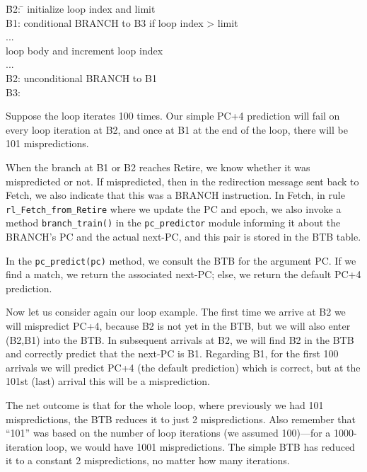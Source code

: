 \begin{tabbing}
\hmm \= B2: \hm \= \kill
     \>         \> initialize loop index and limit \\
     \> B1:     \> conditional BRANCH to B3 if loop index > limit \\
     \>         \> ... \\
     \>         \> loop body and increment loop index \\
     \>         \> ... \\
     \> B2:     \> unconditional BRANCH to B1 \\
     \> B3:
\end{tabbing}

Suppose the loop iterates 100 times. Our simple PC+4 prediction will
fail on every loop iteration at B2, and once at B1 at the end of the
loop, {\ie} there will be 101 mispredictions.

When the branch at B1 or B2 reaches Retire, we know whether it was
mispredicted or not.  If mispredicted, then in the redirection message
sent back to Fetch, we also indicate that this was a BRANCH
instruction. In Fetch, in rule \verb|rl_Fetch_from_Retire| where we
update the PC and epoch, we also invoke a method \verb|branch_train()|
in the \verb|pc_predictor| module informing it about the BRANCH's PC
and the actual next-PC, and this pair is stored in the BTB table.

In the \verb|pc_predict(pc)| method, we consult the BTB for the
argument PC.  If we find a match, we return the associated next-PC;
else, we return the default PC+4 prediction.

Now let us consider again our loop example.  The first time we arrive
at B2 we will mispredict PC+4, because B2 is not yet in the BTB, but
we will also enter (B2,B1) into the BTB.  In subsequent arrivals at
B2, we will find B2 in the BTB and correctly predict that the next-PC
is B1.  Regarding B1, for the first 100 arrivals we will predict PC+4
(the default prediction) which is correct, but at the 101st (last)
arrival this will be a misprediction.

The net outcome is that for the whole loop, where previously we had
101 mispredictions, the BTB reduces it to just 2 mispredictions.  Also
remember that ``101'' was based on the number of loop iterations (we
assumed 100)---for a 1000-iteration loop, we would have 1001
mispredictions.  The simple BTB has reduced it to a constant 2
mispredictions, no matter how many iterations.


